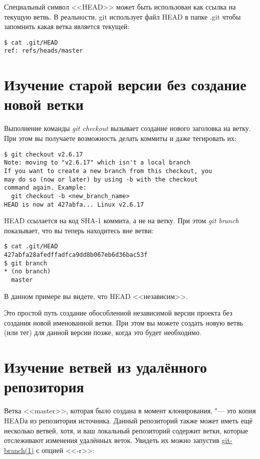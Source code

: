 \documentclass[a4paper, 12pt]{report}
\begin{document}
Специальный символ <<HEAD>> может быть использован как ссылка на текущую ветвь.
В реальности, git использует файл HEAD в папке .git чтобы запомнить какая ветка
является текущей:

\begin{lstlisting}
$ cat .git/HEAD
ref: refs/heads/master
\end{lstlisting}


\section{Изучение старой версии без создание новой ветки}
\hypertarget{#chapter1:examining-an-old-version-without-creating-a-new-branch}{}

Выполнение команды \emph{git checkout} вызывает создание нового заголовка на ветку.
При этом вы получаете возможность делать коммиты и даже тегировать их:

\begin{lstlisting}
$ git checkout v2.6.17
Note: moving to "v2.6.17" which isn't a local branch
If you want to create a new branch from this checkout, you 
may do so (now or later) by using -b with the checkout 
command again. Example:
  git checkout -b <new_branch_name>
HEAD is now at 427abfa... Linux v2.6.17
\end{lstlisting}

HEAD ссылается на код SHA-1 коммита, а не на ветку. При этом \emph{git branch} 
показывает, что вы теперь находитесь вне ветви:

\begin{lstlisting}
$ cat .git/HEAD
427abfa28afedffadfca9dd8b067eb6d36bac53f
$ git branch
* (no branch)
  master
\end{lstlisting}

В данном примере вы видете, что HEAD <<независим>>.

Это простой путь создание обособленной независимой версии проекта без создания
новой именованной ветки. При этом вы можете создать новую ветвь (или тег) для 
данной версии позже, когда это будет необходимо.


\section{Изучение ветвей из удалённого репозитория}

Ветка <<master>>, которая было создана в момент клонирования, "--- это копия
HEADа из репозитория источника. Данный репозиторий также может иметь ещё несколько
ветвей, хотя, и ваш локальный репозиторий содержит ветки, которые отслеживают 
изменения удалённых веток. Увидеть их можно запустив 
\href{http://www.kernel.org/pub/software/scm/git/docs/git-branch.html}{git-branch(1)}
с опцией <<-r>>:
\end{document}

